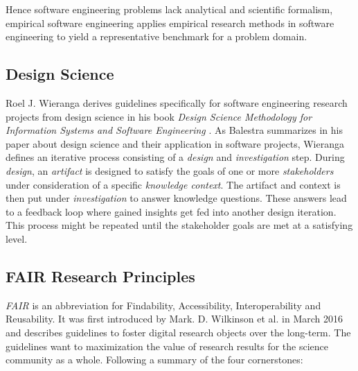 \documentclass[12pt,a4paper]{article}
\begin{document}
Hence software engineering problems lack analytical and scientific formalism, empirical software engineering applies empirical research methods in software engineering to yield a representative benchmark for a problem domain.

\subsection{Design Science}

Roel J. Wieranga derives guidelines specifically for software engineering research projects from design science in his book \emph{Design Science Methodology for Information Systems and Software Engineering} \cite{wieringa}. As Balestra \cite{balestra:2019:designscience:articactandcontext} summarizes in his paper about design science and their application in software projects, Wieranga \cite{wieringa} defines an iterative process consisting of a \emph{design} and \emph{investigation} step. During \emph{design}, an \emph{artifact} is designed to satisfy the goals of one or more \emph{stakeholders} under consideration of a specific \emph{knowledge context}. The artifact and context is then put under \emph{investigation} to answer knowledge questions. These answers lead to a feedback loop where gained insights get fed into another design iteration. This process might be repeated until the stakeholder goals are met at a satisfying level.

\subsection{FAIR Research Principles}
\label{sec:fair}

\emph{FAIR} is an abbreviation for Findability, Accessibility, Interoperability and Reusability. It was first introduced by Mark. D. Wilkinson et al. in March 2016 \cite{wilkinson:2016} and describes guidelines to foster digital research objects over the long-term. The guidelines want to maximization the value of research results for the science community as a whole. Following a summary of the four cornerstones:
\end{document}
